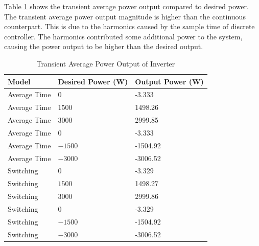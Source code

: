 \documentclass[12pt]{article}
\begin{document}
Table \ref{tab:z-c-transient} shows the transient average power output compared to desired power.
The transient average power output magnitude is higher than the continuous counterpart.
This is due to the harmonics caused by the sample time of discrete controller.
The harmonics contributed some additional power to the system, causing the power output to be higher than the desired output.

\begin{table}[ht]
    \caption{Transient Average Power Output of Inverter}
    \label{tab:z-c-transient}
    \centering{}
    \begin{tabular}{ l l l }
        \hline
        Model        & Desired Power (W) & Output Power (W) \\
        \hline
        Average Time & $0$               & -3.333           \\
        Average Time & $1500$            & 1498.26          \\
        Average Time & $3000$            & 2999.85          \\
        \hline
        Average Time & $0$               & -3.333           \\
        Average Time & $-1500$           & -1504.92         \\
        Average Time & $-3000$           & -3006.52         \\
        \hline
        Switching    & $0$               & -3.329           \\
        Switching    & $1500$            & 1498.27          \\
        Switching    & $3000$            & 2999.86          \\
        \hline
        Switching    & $0$               & -3.329           \\
        Switching    & $-1500$           & -1504.92         \\
        Switching    & $-3000$           & -3006.52         \\
        \hline
    \end{tabular}
\end{table}
\end{document}
